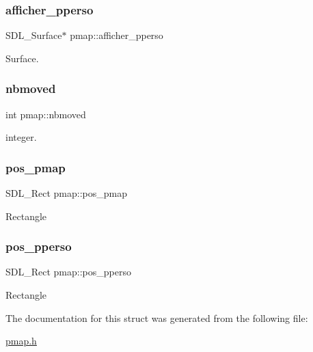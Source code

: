 \subsubsection{\texorpdfstring{afficher\+\_\+pperso}{afficher\_pperso}}
{\footnotesize\ttfamily S\+D\+L\+\_\+\+Surface$\ast$ pmap\+::afficher\+\_\+pperso}

Surface. \mbox{\label{structpmap_a70b813baa5dd1ba32e676491019f344c}} 
\subsubsection{\texorpdfstring{nbmoved}{nbmoved}}
{\footnotesize\ttfamily int pmap\+::nbmoved}

integer. \mbox{\label{structpmap_a1ec871d94c7648f3f1dc49e9cd3146d5}} 
\subsubsection{\texorpdfstring{pos\+\_\+pmap}{pos\_pmap}}
{\footnotesize\ttfamily S\+D\+L\+\_\+\+Rect pmap\+::pos\+\_\+pmap}

Rectangle \mbox{\label{structpmap_a6534b3c60d544631809c86d76450b592}} 
\subsubsection{\texorpdfstring{pos\+\_\+pperso}{pos\_pperso}}
{\footnotesize\ttfamily S\+D\+L\+\_\+\+Rect pmap\+::pos\+\_\+pperso}

Rectangle 

The documentation for this struct was generated from the following file\+:\begin{DoxyCompactItemize}
\item 
\hyperlink{pmap_8h}{pmap.\+h}\end{DoxyCompactItemize}

